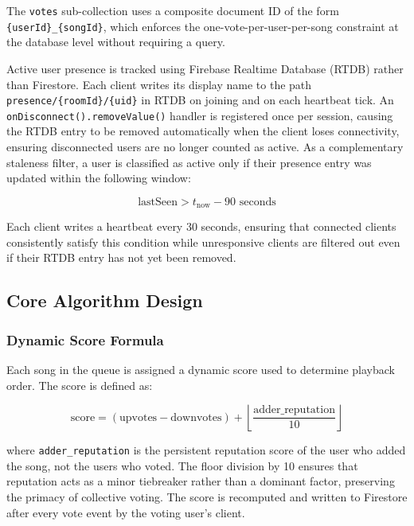 \documentclass[pdflatex,sn-mathphys-num,iicol]{sn-jnl}
\theoremstyle{thmstyleone}%
\theoremstyle{thmstyletwo}%
\theoremstyle{thmstylethree}%
\begin{document}
The \texttt{votes} sub-collection uses a composite document ID of the form
\texttt{\{userId\}\_\{songId\}}, which enforces the one-vote-per-user-per-song
constraint at the database level without requiring a query.

Active user presence is tracked using Firebase Realtime Database (RTDB) rather than
Firestore. Each client writes its display name to the path
\texttt{presence/\{roomId\}/\{uid\}} in RTDB on joining and on each heartbeat tick.
An \texttt{onDisconnect().removeValue()} handler is registered once per session,
causing the RTDB entry to be removed automatically when the client loses connectivity,
ensuring disconnected users are no longer counted as active. As a complementary
staleness filter, a user is classified as active only if their presence entry was
updated within the following window:

\begin{equation}
\text{lastSeen} > t_{\text{now}} - 90\text{ seconds}
\label{eq:presence}
\end{equation}

Each client writes a heartbeat every 30 seconds, ensuring that connected clients
consistently satisfy this condition while unresponsive clients are filtered out even
if their RTDB entry has not yet been removed.

\subsection{Core Algorithm Design}

\subsubsection{Dynamic Score Formula}

Each song in the queue is assigned a dynamic score used to determine playback order.
The score is defined as:

\begin{equation}
\text{score} = (\text{upvotes} - \text{downvotes}) +
\left\lfloor \frac{\text{adder\_reputation}}{10} \right\rfloor
\label{eq:score}
\end{equation}

where \texttt{adder\_reputation} is the persistent reputation score of the user who
added the song, not the users who voted. The floor division by 10 ensures that
reputation acts as a minor tiebreaker rather than a dominant factor, preserving the
primacy of collective voting. The score is recomputed and written to Firestore after
every vote event by the voting user's client.
\end{document}
